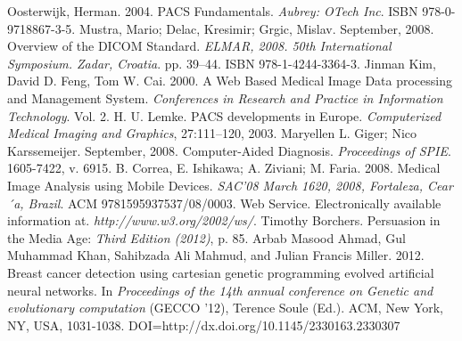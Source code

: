 \begin{thebibliography}{}
\clearpage

\bibitem{} Oosterwijk, Herman. 2004. PACS Fundamentals. \emph{Aubrey: OTech Inc}. ISBN 978-0-9718867-3-5.
\bibitem{} Mustra, Mario; Delac, Kresimir; Grgic, Mislav. September, 2008. Overview of the DICOM Standard. \emph{ELMAR, 2008. 50th International Symposium. Zadar, Croatia}. pp. 39–44. ISBN 978-1-4244-3364-3.
\bibitem{} Jinman Kim, David D. Feng, Tom W. Cai. 2000. A Web Based Medical Image Data processing and Management System. \emph{Conferences
in Research and Practice in Information Technology}. Vol. 2.
\bibitem{} H. U. Lemke. PACS developments in Europe. \emph{Computerized Medical Imaging and Graphics}, 27:111–120, 2003.
\bibitem{} Maryellen L. Giger; Nico Karssemeijer. September, 2008. Computer-Aided Diagnosis. \emph{Proceedings of SPIE}. 1605-7422, v. 6915.
\bibitem{} B. Correa, E. Ishikawa; A. Ziviani; M. Faria. 2008. Medical Image Analysis using Mobile Devices. \emph{SAC’08 March 1620, 2008, Fortaleza, Cear´a, Brazil}. ACM 9781595937537/08/0003.
\bibitem{} Web Service. Electronically available information at. \emph{http://www.w3.org/2002/ws/}.
\bibitem{} Timothy Borchers. Persuasion in the Media Age: \emph{Third Edition (2012)}, p. 85.
\bibitem{} Arbab Masood Ahmad, Gul Muhammad Khan, Sahibzada Ali Mahmud, and Julian Francis Miller. 2012. Breast cancer detection using cartesian genetic programming evolved artificial neural networks.  In \emph{Proceedings of the 14th annual conference on Genetic and evolutionary computation} (GECCO '12), Terence Soule (Ed.). ACM, New York, NY, USA,  1031-1038. DOI=http://dx.doi.org/10.1145/2330163.2330307
\end{thebibliography}


